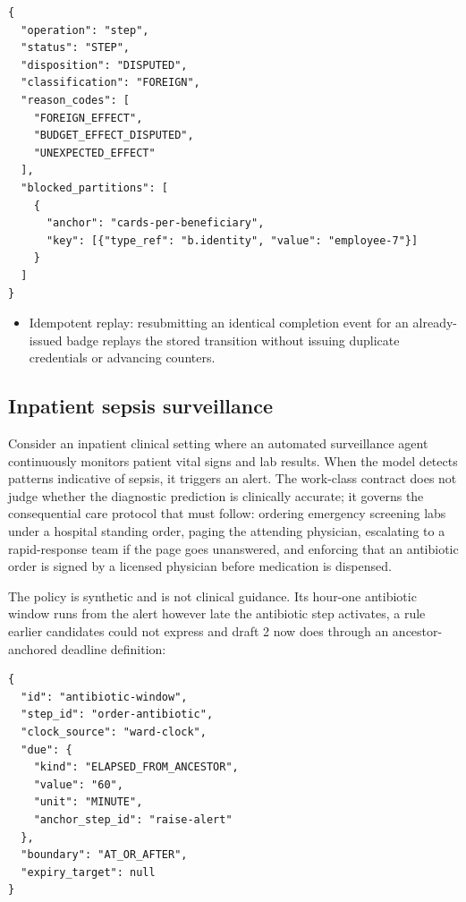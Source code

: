 \documentclass[
  american,
  11pt,
  letterpaper,
]{article}
\providecommand{\tightlist}{%
  \setlength{\itemsep}{0pt}\setlength{\parskip}{0pt}}
\begin{document}
\begin{lstlisting}
{
  "operation": "step",
  "status": "STEP",
  "disposition": "DISPUTED",
  "classification": "FOREIGN",
  "reason_codes": [
    "FOREIGN_EFFECT",
    "BUDGET_EFFECT_DISPUTED",
    "UNEXPECTED_EFFECT"
  ],
  "blocked_partitions": [
    {
      "anchor": "cards-per-beneficiary",
      "key": [{"type_ref": "b.identity", "value": "employee-7"}]
    }
  ]
}
\end{lstlisting}

\begin{itemize}
\tightlist
\item
  Idempotent replay: resubmitting an identical completion event for an
  already-issued badge replays the stored transition without issuing
  duplicate credentials or advancing counters.
\end{itemize}

\subsection{Inpatient sepsis
surveillance}\label{inpatient-sepsis-surveillance}

Consider an inpatient clinical setting where an automated surveillance
agent continuously monitors patient vital signs and lab results. When
the model detects patterns indicative of sepsis, it triggers an alert.
The work-class contract does not judge whether the diagnostic prediction
is clinically accurate; it governs the consequential care protocol that
must follow: ordering emergency screening labs under a hospital standing
order, paging the attending physician, escalating to a rapid-response
team if the page goes unanswered, and enforcing that an antibiotic order
is signed by a licensed physician before medication is dispensed.

The policy is synthetic and is not clinical guidance. Its hour-one
antibiotic window runs from the alert however late the antibiotic step
activates, a rule earlier candidates could not express and draft 2 now
does through an ancestor-anchored deadline definition:

\begin{lstlisting}
{
  "id": "antibiotic-window",
  "step_id": "order-antibiotic",
  "clock_source": "ward-clock",
  "due": {
    "kind": "ELAPSED_FROM_ANCESTOR",
    "value": "60",
    "unit": "MINUTE",
    "anchor_step_id": "raise-alert"
  },
  "boundary": "AT_OR_AFTER",
  "expiry_target": null
}
\end{lstlisting}
\end{document}
